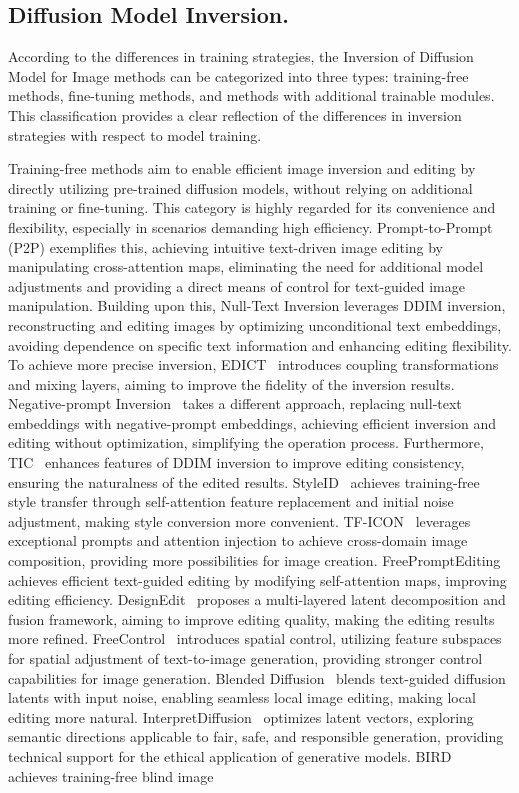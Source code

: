 \subsection{Diffusion Model Inversion.}
According to the differences in training strategies, the Inversion of Diffusion Model for Image methods can be categorized into three types: training-free methods, fine-tuning methods, and methods with additional trainable modules. This classification provides a clear reflection of the differences in inversion strategies with respect to model training.

Training-free methods aim to enable efficient image inversion and editing by directly utilizing pre-trained diffusion models, without relying on additional training or fine-tuning. This category is highly regarded for its convenience and flexibility, especially in scenarios demanding high efficiency. Prompt-to-Prompt (P2P)\cite{p2p} exemplifies this, achieving intuitive text-driven image editing by manipulating cross-attention maps, eliminating the need for additional model adjustments and providing a direct means of control for text-guided image manipulation. Building upon this, Null-Text Inversion\cite{Null-Text} leverages DDIM inversion, reconstructing and editing images by optimizing unconditional text embeddings, avoiding dependence on specific text information and enhancing editing flexibility. To achieve more precise inversion, EDICT~\cite{EDICT} introduces coupling transformations and mixing layers, aiming to improve the fidelity of the inversion results. Negative-prompt Inversion~\cite{Negative-prompt} takes a different approach, replacing null-text embeddings with negative-prompt embeddings, achieving efficient inversion and editing without optimization, simplifying the operation process. Furthermore, TIC~\cite{TIC} enhances features of DDIM inversion to improve editing consistency, ensuring the naturalness of the edited results. StyleID~\cite{StyleID} achieves training-free style transfer through self-attention feature replacement and initial noise adjustment, making style conversion more convenient. TF-ICON~\cite{TF-ICON} leverages exceptional prompts and attention injection to achieve cross-domain image composition, providing more possibilities for image creation. FreePromptEditing~\cite{FreePromptEditing} achieves efficient text-guided editing by modifying self-attention maps, improving editing efficiency. DesignEdit~\cite{DesignEdit} proposes a multi-layered latent decomposition and fusion framework, aiming to improve editing quality, making the editing results more refined. FreeControl~\cite{FreeControl} introduces spatial control, utilizing feature subspaces for spatial adjustment of text-to-image generation, providing stronger control capabilities for image generation. Blended Diffusion~\cite{Blended} blends text-guided diffusion latents with input noise, enabling seamless local image editing, making local editing more natural. InterpretDiffusion~\cite{InterpretDiffusion} optimizes latent vectors, exploring semantic directions applicable to fair, safe, and responsible generation, providing technical support for the ethical application of generative models. BIRD~\cite{BIRD} achieves training-free blind image 